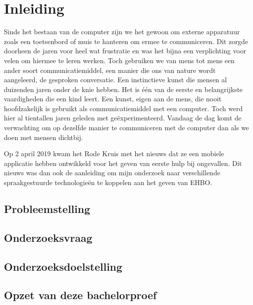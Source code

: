 
\chapter{Inleiding}
\label{ch:inleiding}
Sinds het bestaan van de computer zijn we het gewoon om externe apparatuur zoals een toetsenbord of muis te hanteren om ermee te communiceren. Dit zorgde doorheen de jaren voor heel wat frustratie en was het bijna een verplichting voor velen om hiermee te leren werken. Toch gebruiken we van mens tot mens een ander soort communicatiemiddel, een manier die ons van nature wordt aangeleerd, de gesproken conversatie.
Een instinctieve kunst die mensen al duizenden jaren onder de knie hebben. Het is één van de eerste en belangrijkste vaardigheden die een kind leert. Een kunst, eigen aan de mens, die nooit hoofdzakelijk is gebruikt als communicatiemiddel met een computer. Toch werd hier al tientallen jaren geleden met geëxperimenteerd. Vandaag de dag komt de verwachting om op dezelfde manier te communiceren met de computer dan als we doen met mensen dichtbij.

Op 2 april 2019 kwam het Rode Kruis met het nieuws dat ze een mobiele applicatie hebben ontwikkeld voor het geven van eerste hulp bij ongevallen. Dit nieuws was dan ook de aanleiding om mijn onderzoek naar verschillende spraakgestuurde technologieën te koppelen aan het geven van EHBO. 

\section{Probleemstelling}
\label{sec:probleemstelling}

\section{Onderzoeksvraag}
\label{sec:onderzoeksvraag} 

\section{Onderzoeksdoelstelling}
\label{sec:onderzoeksdoelstelling}

\section{Opzet van deze bachelorproef}
\label{sec:opzet-bachelorproef}


